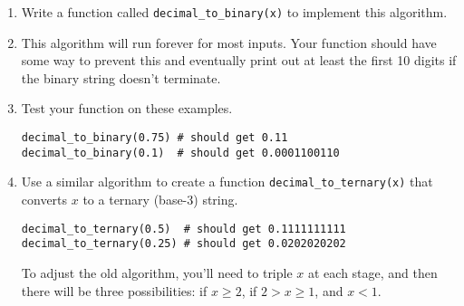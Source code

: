 \documentclass[11pt]{article}
\begin{document}
\begin{enumerate}
\item Write a function called \verb|decimal_to_binary(x)| to implement this algorithm.

\item This algorithm will run forever for most inputs. Your function should have some way to prevent this and eventually print out at least the first 10 digits if the binary string doesn't terminate. %

\item Test your function on these examples. 
\begin{verbatim}
decimal_to_binary(0.75) # should get 0.11
decimal_to_binary(0.1)  # should get 0.0001100110 
\end{verbatim}

\item Use a similar algorithm to create a function \verb|decimal_to_ternary(x)| that converts $x$ to a ternary (base-3) string. 
\begin{verbatim}
decimal_to_ternary(0.5)  # should get 0.1111111111
decimal_to_ternary(0.25) # should get 0.0202020202 
\end{verbatim}
To adjust the old algorithm, you'll need to triple $x$ at each stage, and then there will be three possibilities: if $x \ge 2$, if $2 > x \ge 1$, and $x < 1$.  
\end{enumerate}
\end{document}
